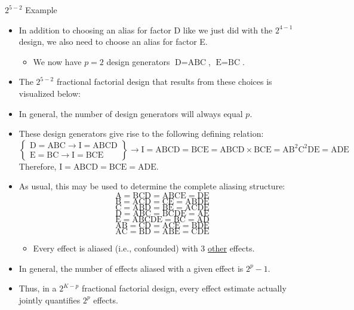 \begin{Example}{$ 2^{5-2} $ Example}{}
      \begin{itemize}
            \item In addition to choosing an alias for factor D like we just did with the $ 2^{4-1} $ design, we also need to choose an alias for factor E.
                  \begin{itemize}[label={}]
                        \item We now have $ p=2 $ design generators $ \text{D}=\text{ABC} $, $ \text{E}=\text{BC} $.
                  \end{itemize}
      \end{itemize}
      \begin{itemize}[*]
            \item The $ 2^{5-2} $ fractional factorial design that results from these choices is visualized below:
            \item In general, the number of design generators will always equal $ p $.
      \end{itemize}
      \begin{itemize}
            \item These design generators give rise to the following defining relation:
                  \[ \begin{Bmatrix}
                              \text{D}=\text{ABC}\rightarrow \text{I}=\text{ABCD} \\
                              \text{E}=\text{BC}\rightarrow \text{I}=\text{BCE}
                        \end{Bmatrix}\rightarrow
                        \text{I}=\text{ABCD}=\text{BCE}=\text{ABCD}\times\text{BCE}=\text{A}\text{B}^2\text{C}^2\text{DE}=\text{ADE} \]
                  Therefore, $ \text{I}=\text{ABCD}=\text{BCE}=\text{ADE} $.
            \item As usual, this may be used to determine the complete aliasing structure:
                  \[ \text{A}=\text{BCD}=\text{ABCE}=\text{DE} \]
                  \[ \text{B}=\text{ACD}=\text{CE}=\text{ABDE} \]
                  \[ \text{C}=\text{ABD}=\text{BE}=\text{ACDE} \]
                  \[ \text{D}=\text{ABC}=\text{BCDE}=\text{AE} \]
                  \[ \text{E}=\text{ABCDE}=\text{BC}=\text{AD} \]
                  \[ \text{AB}=\text{CD}=\text{ACE}=\text{BDE} \]
                  \[ \text{AC}=\text{BD}=\text{ABE}=\text{CDE} \]
                  \begin{itemize}[*]
                        \item Every effect is aliased (i.e., confounded) with 3 \underline{other} effects.
                  \end{itemize}
      \end{itemize}
      \begin{itemize}[*]
            \item In general, the number of effects aliased with a given effect is $ 2^{p}-1 $.
            \item Thus, in a $ 2^{K-p} $ fractional factorial design, every effect estimate actually jointly quantifies $2^p$ effects.
      \end{itemize}
\end{Example}
